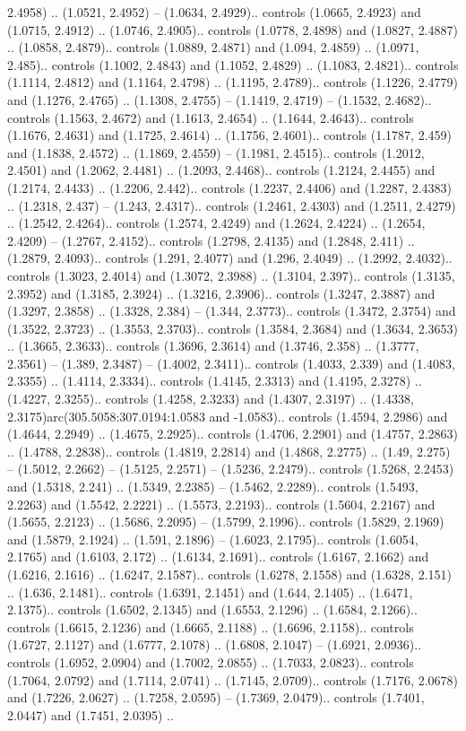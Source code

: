 2.4958) .. (1.0521, 2.4952) -- (1.0634, 2.4929).. controls (1.0665, 2.4923) and (1.0715, 2.4912) .. (1.0746, 2.4905).. controls (1.0778, 2.4898) and (1.0827, 2.4887) .. (1.0858, 2.4879).. controls (1.0889, 2.4871) and (1.094, 2.4859) .. (1.0971, 2.485).. controls (1.1002, 2.4843) and (1.1052, 2.4829) .. (1.1083, 2.4821).. controls (1.1114, 2.4812) and (1.1164, 2.4798) .. (1.1195, 2.4789).. controls (1.1226, 2.4779) and (1.1276, 2.4765) .. (1.1308, 2.4755) -- (1.1419, 2.4719) -- (1.1532, 2.4682).. controls (1.1563, 2.4672) and (1.1613, 2.4654) .. (1.1644, 2.4643).. controls (1.1676, 2.4631) and (1.1725, 2.4614) .. (1.1756, 2.4601).. controls (1.1787, 2.459) and (1.1838, 2.4572) .. (1.1869, 2.4559) -- (1.1981, 2.4515).. controls (1.2012, 2.4501) and (1.2062, 2.4481) .. (1.2093, 2.4468).. controls (1.2124, 2.4455) and (1.2174, 2.4433) .. (1.2206, 2.442).. controls (1.2237, 2.4406) and (1.2287, 2.4383) .. (1.2318, 2.437) -- (1.243, 2.4317).. controls (1.2461, 2.4303) and (1.2511, 2.4279) .. (1.2542, 2.4264).. controls (1.2574, 2.4249) and (1.2624, 2.4224) .. (1.2654, 2.4209) -- (1.2767, 2.4152).. controls (1.2798, 2.4135) and (1.2848, 2.411) .. (1.2879, 2.4093).. controls (1.291, 2.4077) and (1.296, 2.4049) .. (1.2992, 2.4032).. controls (1.3023, 2.4014) and (1.3072, 2.3988) .. (1.3104, 2.397).. controls (1.3135, 2.3952) and (1.3185, 2.3924) .. (1.3216, 2.3906).. controls (1.3247, 2.3887) and (1.3297, 2.3858) .. (1.3328, 2.384) -- (1.344, 2.3773).. controls (1.3472, 2.3754) and (1.3522, 2.3723) .. (1.3553, 2.3703).. controls (1.3584, 2.3684) and (1.3634, 2.3653) .. (1.3665, 2.3633).. controls (1.3696, 2.3614) and (1.3746, 2.358) .. (1.3777, 2.3561) -- (1.389, 2.3487) -- (1.4002, 2.3411).. controls (1.4033, 2.339) and (1.4083, 2.3355) .. (1.4114, 2.3334).. controls (1.4145, 2.3313) and (1.4195, 2.3278) .. (1.4227, 2.3255).. controls (1.4258, 2.3233) and (1.4307, 2.3197) .. (1.4338, 2.3175)arc(305.5058:307.0194:1.0583 and -1.0583).. controls (1.4594, 2.2986) and (1.4644, 2.2949) .. (1.4675, 2.2925).. controls (1.4706, 2.2901) and (1.4757, 2.2863) .. (1.4788, 2.2838).. controls (1.4819, 2.2814) and (1.4868, 2.2775) .. (1.49, 2.275) -- (1.5012, 2.2662) -- (1.5125, 2.2571) -- (1.5236, 2.2479).. controls (1.5268, 2.2453) and (1.5318, 2.241) .. (1.5349, 2.2385) -- (1.5462, 2.2289).. controls (1.5493, 2.2263) and (1.5542, 2.2221) .. (1.5573, 2.2193).. controls (1.5604, 2.2167) and (1.5655, 2.2123) .. (1.5686, 2.2095) -- (1.5799, 2.1996).. controls (1.5829, 2.1969) and (1.5879, 2.1924) .. (1.591, 2.1896) -- (1.6023, 2.1795).. controls (1.6054, 2.1765) and (1.6103, 2.172) .. (1.6134, 2.1691).. controls (1.6167, 2.1662) and (1.6216, 2.1616) .. (1.6247, 2.1587).. controls (1.6278, 2.1558) and (1.6328, 2.151) .. (1.636, 2.1481).. controls (1.6391, 2.1451) and (1.644, 2.1405) .. (1.6471, 2.1375).. controls (1.6502, 2.1345) and (1.6553, 2.1296) .. (1.6584, 2.1266).. controls (1.6615, 2.1236) and (1.6665, 2.1188) .. (1.6696, 2.1158).. controls (1.6727, 2.1127) and (1.6777, 2.1078) .. (1.6808, 2.1047) -- (1.6921, 2.0936).. controls (1.6952, 2.0904) and (1.7002, 2.0855) .. (1.7033, 2.0823).. controls (1.7064, 2.0792) and (1.7114, 2.0741) .. (1.7145, 2.0709).. controls (1.7176, 2.0678) and (1.7226, 2.0627) .. (1.7258, 2.0595) -- (1.7369, 2.0479).. controls (1.7401, 2.0447) and (1.7451, 2.0395) .. 